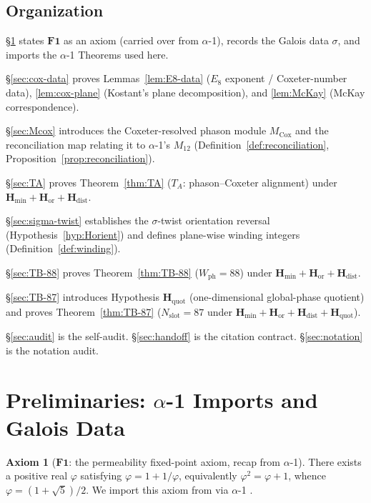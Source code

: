 \documentclass[11pt, a4paper]{amsart}
\theoremstyle{definition}
\newtheorem{axiom}[theorem]{Axiom}
\newcommand{\Hmin}{\mathbf{H}_{\min}}
\newcommand{\Hor}{\mathbf{H}_{\mathrm{or}}}
\newcommand{\Hdist}{\mathbf{H}_{\mathrm{dist}}}
\newcommand{\Hquot}{\mathbf{H}_{\mathrm{quot}}}
\newcommand{\Mcox}{M_{\mathrm{Cox}}}
\newcommand{\Mtw}{M_{12}}
\newcommand{\Wph}{W_{\mathrm{ph}}}
\newcommand{\Nslot}{N_{\mathrm{slot}}}
\begin{document}
\subsection{Organization}

\S\ref{sec:prelims} states $\mathbf{F1}$ as an axiom (carried
over from $\alpha$-1), records the Galois data $\sigma$, and
imports the $\alpha$-1 Theorems used here.

\S\ref{sec:cox-data} proves Lemmas~\ref{lem:E8-data}
($E_8$ exponent / Coxeter-number data),
\ref{lem:cox-plane} (Kostant's plane decomposition), and
\ref{lem:McKay} (McKay correspondence).

\S\ref{sec:Mcox} introduces the Coxeter-resolved phason
module $\Mcox$ and the reconciliation map relating it to
$\alpha$-1's $\Mtw$ (Definition~\ref{def:reconciliation},
Proposition~\ref{prop:reconciliation}).

\S\ref{sec:TA} proves Theorem~\ref{thm:TA} ($T_A$:
phason--Coxeter alignment) under $\Hmin + \Hor + \Hdist$.

\S\ref{sec:sigma-twist} establishes the $\sigma$-twist
orientation reversal (Hypothesis~\ref{hyp:Horient}) and defines
plane-wise winding integers (Definition~\ref{def:winding}).

\S\ref{sec:TB-88} proves Theorem~\ref{thm:TB-88}
($\Wph = 88$) under $\Hmin + \Hor + \Hdist$.

\S\ref{sec:TB-87} introduces Hypothesis $\Hquot$
(one-dimensional global-phase quotient) and proves
Theorem~\ref{thm:TB-87} ($\Nslot = 87$ under $\Hmin + \Hor +
\Hdist + \Hquot$).

\S\ref{sec:audit} is the self-audit.
\S\ref{sec:handoff} is the citation contract.
\S\ref{sec:notation} is the notation audit.

\section{Preliminaries: $\alpha$-1 Imports and Galois Data}
\label{sec:prelims}

\begin{axiom}[$\mathbf{F1}$: the permeability fixed-point
  axiom, recap from $\alpha$-1]
\label{ax:F1}
There exists a positive real $\varphi$ satisfying
$\varphi = 1 + 1/\varphi$, equivalently $\varphi^2 = \varphi
+ 1$, whence $\varphi = (1 + \sqrt{5})/2$. We import this
axiom from \cite[\S F1]{CascadeFoundations} via $\alpha$-1
\cite[Axiom~ax:F1]{Cascade12D}.
\end{axiom}
\end{document}
